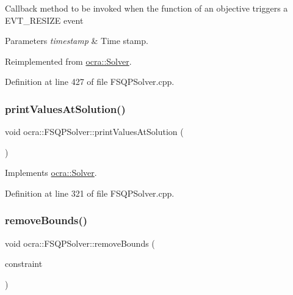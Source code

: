 Callback method to be invoked when the function of an objective triggers a E\+V\+T\+\_\+\+R\+E\+S\+I\+ZE event


\begin{DoxyParams}{Parameters}
{\em timestamp} & Time stamp. \\
\hline
\end{DoxyParams}


Reimplemented from \hyperlink{classocra_1_1Solver_a7d45f67599edfa5ba8373b115378de5c}{ocra\+::\+Solver}.



Definition at line 427 of file F\+S\+Q\+P\+Solver.\+cpp.

\hypertarget{classocra_1_1FSQPSolver_ad41514dc166b19fca4812b5521777f0a}{}\label{classocra_1_1FSQPSolver_ad41514dc166b19fca4812b5521777f0a} 
\subsubsection{\texorpdfstring{print\+Values\+At\+Solution()}{printValuesAtSolution()}}
{\footnotesize\ttfamily void ocra\+::\+F\+S\+Q\+P\+Solver\+::print\+Values\+At\+Solution (\begin{DoxyParamCaption}\item[{void}]{ }\end{DoxyParamCaption})\hspace{0.3cm}{\ttfamily [virtual]}}



Implements \hyperlink{classocra_1_1Solver_ab1903098e25c16a9f92c36d37967e8fa}{ocra\+::\+Solver}.



Definition at line 321 of file F\+S\+Q\+P\+Solver.\+cpp.

\hypertarget{classocra_1_1FSQPSolver_a4dae031d10c7c4be13cd48de8588e69a}{}\label{classocra_1_1FSQPSolver_a4dae031d10c7c4be13cd48de8588e69a} 
\subsubsection{\texorpdfstring{remove\+Bounds()}{removeBounds()}\hspace{0.1cm}{\footnotesize\ttfamily [1/2]}}
{\footnotesize\ttfamily void ocra\+::\+F\+S\+Q\+P\+Solver\+::remove\+Bounds (\begin{DoxyParamCaption}\item[{\hyperlink{namespaceocra_a6e55fff77635080219964abc301abf18}{Bound\+Constraint} \&}]{constraint }\end{DoxyParamCaption})}



